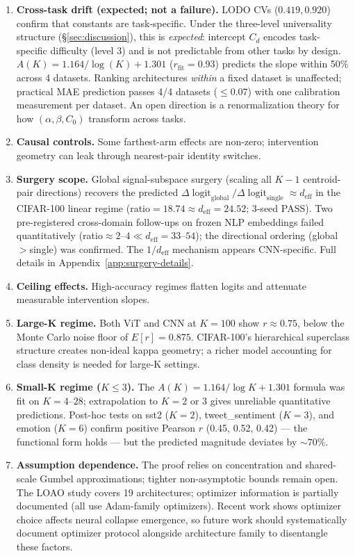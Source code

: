 \documentclass{article}
\DeclareMathOperator{\logit}{logit}
\begin{document}
\begin{enumerate}
\item \textbf{Cross-task drift (expected; not a failure).} LODO CVs ($0.419, 0.920$) confirm that constants are task-specific. Under the three-level universality structure (\S\ref{sec:discussion}), this is \emph{expected}: intercept $C_d$ encodes task-specific difficulty (level 3) and is not predictable from other tasks by design. $A(K) = 1.164/\log(K) + 1.301$ ($r_\mathrm{fit}=0.93$) predicts the slope within 50\% across 4 datasets. Ranking architectures \emph{within} a fixed dataset is unaffected; practical MAE prediction passes 4/4 datasets ($\leq$0.07) with one calibration measurement per dataset. An open direction is a renormalization theory for how $(\alpha,\beta,C_0)$ transform across tasks.
\item \textbf{Causal controls.} Some farthest-arm effects are non-zero; intervention geometry can leak through nearest-pair identity switches.
\item \textbf{Surgery scope.} Global signal-subspace surgery (scaling all $K-1$ centroid-pair directions) recovers the predicted $\Delta\logit_{\mathrm{global}}/\Delta\logit_{\mathrm{single}}\approx d_{\mathrm{eff}}$ in the CIFAR-100 linear regime (ratio$=18.74\approx d_{\mathrm{eff}}=24.52$; 3-seed PASS). Two pre-registered cross-domain follow-ups on frozen NLP embeddings failed quantitatively (ratio$\approx2$--$4\ll d_{\mathrm{eff}}=33$--$54$); the directional ordering (global$>$single) was confirmed. The $1/d_{\mathrm{eff}}$ mechanism appears CNN-specific. Full details in Appendix~\ref{app:surgery-details}.
\item \textbf{Ceiling effects.} High-accuracy regimes flatten logits and attenuate measurable intervention slopes.
\item \textbf{Large-K regime.} Both ViT and CNN at $K=100$ show $r\approx0.75$, below the Monte Carlo noise floor of $E[r]=0.875$. CIFAR-100's hierarchical superclass structure creates non-ideal kappa geometry; a richer model accounting for class density is needed for large-K settings.
\item \textbf{Small-K regime ($K\leq3$).} The $A(K)=1.164/\log K+1.301$ formula was fit on $K=4$--$28$; extrapolation to $K=2$ or $3$ gives unreliable quantitative predictions. Post-hoc tests on sst2 ($K=2$), tweet\_sentiment ($K=3$), and emotion ($K=6$) confirm positive Pearson $r$ (0.45, 0.52, 0.42) --- the functional form holds --- but the predicted magnitude deviates by $\sim70\%$.
\item \textbf{Assumption dependence.} The proof relies on concentration and shared-scale Gumbel approximations; tighter non-asymptotic bounds remain open. The LOAO study covers 19 architectures; optimizer information is partially documented (all use Adam-family optimizers). Recent work \citep{zhao2026optimizer} shows optimizer choice affects neural collapse emergence, so future work should systematically document optimizer protocol alongside architecture family to disentangle these factors.

\end{enumerate}
\end{document}
